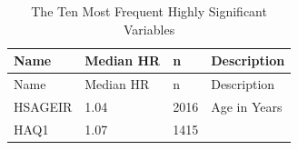 \documentclass[12pt,oneside]{reedthesis}
\theoremstyle{definition}
\theoremstyle{definition}
\theoremstyle{definition}
\theoremstyle{remark}
\begin{document}
\begin{longtable}[]{@{}llll@{}}
\caption{The Ten Most Frequent Highly Significant
Variables}\tabularnewline
\toprule
\begin{minipage}[b]{0.21\columnwidth}\raggedright
Name\strut
\end{minipage} & \begin{minipage}[b]{0.23\columnwidth}\raggedright
Median HR\strut
\end{minipage} & \begin{minipage}[b]{0.12\columnwidth}\raggedright
n\strut
\end{minipage} & \begin{minipage}[b]{0.33\columnwidth}\raggedright
Description\strut
\end{minipage}\tabularnewline
\midrule
\endfirsthead
\toprule
\begin{minipage}[b]{0.21\columnwidth}\raggedright
Name\strut
\end{minipage} & \begin{minipage}[b]{0.23\columnwidth}\raggedright
Median HR\strut
\end{minipage} & \begin{minipage}[b]{0.12\columnwidth}\raggedright
n\strut
\end{minipage} & \begin{minipage}[b]{0.33\columnwidth}\raggedright
Description\strut
\end{minipage}\tabularnewline
\midrule
\endhead
\begin{minipage}[t]{0.21\columnwidth}\raggedright
HSAGEIR\strut
\end{minipage} & \begin{minipage}[t]{0.23\columnwidth}\raggedright
1.04\strut
\end{minipage} & \begin{minipage}[t]{0.12\columnwidth}\raggedright
2016\strut
\end{minipage} & \begin{minipage}[t]{0.33\columnwidth}\raggedright
Age in Years\strut
\end{minipage}\tabularnewline
\begin{minipage}[t]{0.21\columnwidth}\raggedright
HAQ1\strut
\end{minipage} & \begin{minipage}[t]{0.23\columnwidth}\raggedright
1.07\strut
\end{minipage} & \begin{minipage}[t]{0.12\columnwidth}\raggedright
1415\strut
\end{minipage} & \begin{minipage}[t]{0.33\columnwidth}\raggedright

\end{minipage}
\end{longtable}
\end{document}
